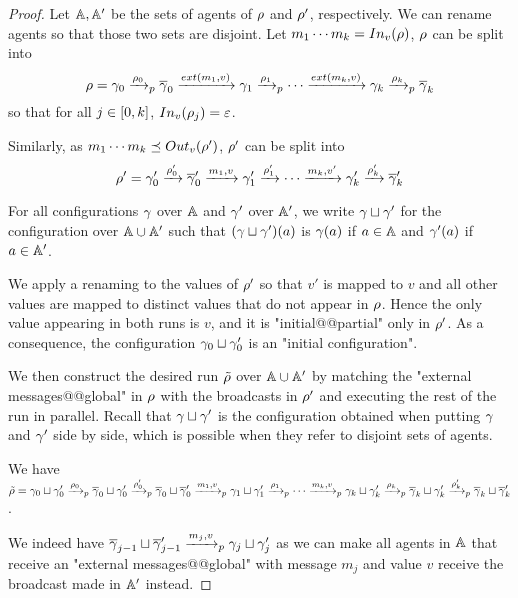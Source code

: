 \begin{proof}
	Let $\mathbb{A}, \mathbb{A}'$ be the sets of agents of $\rho$ and $\rho'$, respectively.
	We can rename agents so that those two sets are disjoint.	
	Let $m_1 \cdots m_k = \vinput{v}{\run}$, $\rho$ can be split into \[ \run = \config_0 \pstep{\run_0} \overline{\config}_0 \extbr{m_1}{v} \config_1 \pstep{\run_1} \cdots \extbr{m_k}{v} \config_{k} \pstep{\run_k} \overline{\config}_k\] 
	so that for all $j\in [0,k]$, $\vinput{v}{\run_j} = \varepsilon$.
	
	Similarly, as $m_1\cdots m_k \subword \voutput{v}{\run'}$, $\rho'$ can be split into \[\rho' = \gamma'_0 \xrightarrow{\rho'_0} \overline{\gamma}'_0 \xrightarrow{m_1, v} \gamma'_{1} \xrightarrow{\rho'_1} \cdots \xrightarrow{m_k,v'} \gamma'_{k} \xrightarrow{\rho'_k} \overline{\gamma}'_k \]
	
	For all configurations $\gamma$ over $\mathbb{A}$ and $\gamma'$ over $\mathbb{A}'$, we write $\gamma \sqcup \gamma'$ for the configuration over $\mathbb{A} \cup \mathbb{A}'$ such that $(\gamma \sqcup \gamma')(a)$ is $\gamma(a)$ if $a \in \mathbb{A}$ and $\gamma'(a)$ if $a \in \mathbb{A}'$.
	
	We apply a renaming to the values of $\rho'$ so that $v'$ is mapped to $v$ and all other values are mapped to distinct values that do not appear in $\rho$.
	Hence the only value appearing in both runs is $v$, and it is "initial@@partial" only in $\rho'$. As a consequence, the configuration $\gamma_0 \sqcup \gamma'_0$ is an "initial configuration".
	
	We then construct the desired run $\Tilde{\rho}$ over $\mathbb{A} \cup \mathbb{A}'$ by matching the "external messages@@global" in $\rho$ with the broadcasts in $\rho'$ and executing the rest of the run in parallel. Recall that $\gamma \sqcup \gamma'$ is the configuration obtained when putting $\gamma$ and $\gamma'$ side by side, which is possible when they refer to disjoint sets of agents. 
	
	We have $\Tilde{\rho} = \gamma_0 \sqcup \gamma'_0 \xrightarrow{\rho_0}_{p} \overline{\gamma}_0 \sqcup \gamma'_0 \xrightarrow{\rho'_0}_{p} \overline{\gamma}_0 \sqcup \overline{\gamma}'_0 \xrightarrow{m_1, v}_{p} \gamma_{1} \sqcup \gamma'_1 \xrightarrow{\rho_1}_{p} \cdots \xrightarrow{m_k,v}_{p} \gamma_{k}  \sqcup \gamma'_{k} \xrightarrow{\rho_k}_{p}  \overline{\gamma}_k \sqcup \gamma'_k \xrightarrow{\rho'_k}_{p} \overline{\gamma}_k \sqcup \overline{\gamma}'_k$.
	
	We indeed have $\overline{\gamma}_{j-1} \sqcup \overline{\gamma}'_{j-1} \xrightarrow{m_j, v}_{p} \gamma_{j} \sqcup \gamma'_j$ as we can make all agents in $\mathbb{A}$ that receive an "external messages@@global" with message $m_j$ and value $v$ receive the broadcast made in $\mathbb{A}'$ instead.
	

\end{proof}
